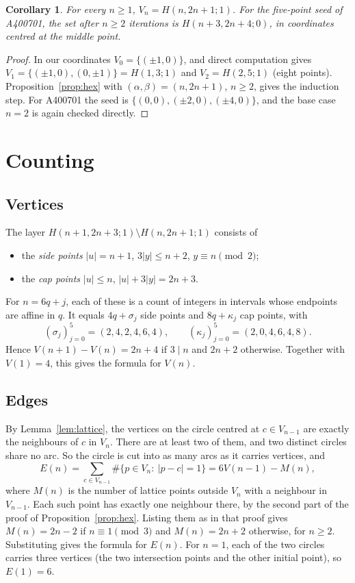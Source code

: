 \documentclass[11pt,a4paper]{amsart}
\newtheorem{corollary}[theorem]{Corollary}
\theoremstyle{definition}
\theoremstyle{remark}
\begin{document}
\begin{corollary}\label{cor:shape}
For every $n\ge1$, $V_n=H(n,2n+1;1)$. For the five-point seed of A400701, the set after $n\ge2$ iterations is $H(n+3,2n+4;0)$, in coordinates centred at the middle point.
\end{corollary}

\begin{proof}
In our coordinates $V_0=\{(\pm1,0)\}$, and direct computation gives $V_1=\{(\pm1,0),(0,\pm1)\}=H(1,3;1)$ and $V_2=H(2,5;1)$ (eight points). Proposition~\ref{prop:hex} with $(\alpha,\beta)=(n,2n+1)$, $n\ge2$, gives the induction step. For A400701 the seed is $\{(0,0),(\pm2,0),(\pm4,0)\}$, and the base case $n=2$ is again checked directly.
\end{proof}

\section{Counting}

\subsection{Vertices} The layer $H(n+1,2n+3;1)\setminus H(n,2n+1;1)$ consists of
\begin{itemize}[leftmargin=2em]
\item the \emph{side points} $|u|=n+1$, $3|y|\le n+2$, $y\equiv n\pmod2$;
\item the \emph{cap points} $|u|\le n$, $|u|+3|y|=2n+3$.
\end{itemize}
For $n=6q+j$, each of these is a count of integers in intervals whose endpoints are affine in $q$. It equals $4q+\sigma_j$ side points and $8q+\kappa_j$ cap points, with
\[
(\sigma_j)_{j=0}^5=(2,4,2,4,6,4),\qquad(\kappa_j)_{j=0}^5=(2,0,4,6,4,8).
\]
Hence $V(n+1)-V(n)=2n+4$ if $3\mid n$ and $2n+2$ otherwise. Together with $V(1)=4$, this gives the formula for $V(n)$.

\subsection{Edges} By Lemma~\ref{lem:lattice}, the vertices on the circle centred at $c\in V_{n-1}$ are exactly the neighbours of $c$ in $V_n$. There are at least two of them, and two distinct circles share no arc. So the circle is cut into as many arcs as it carries vertices, and
\[
E(n)=\sum_{c\in V_{n-1}}\#\{p\in V_n:\ |p-c|=1\}=6V(n-1)-M(n),
\]
where $M(n)$ is the number of lattice points outside $V_n$ with a neighbour in $V_{n-1}$. Each such point has exactly one neighbour there, by the second part of the proof of Proposition~\ref{prop:hex}. Listing them as in that proof gives $M(n)=2n-2$ if $n\equiv1\pmod3$ and $M(n)=2n+2$ otherwise, for $n\ge2$. Substituting gives the formula for $E(n)$. For $n=1$, each of the two circles carries three vertices (the two intersection points and the other initial point), so $E(1)=6$.
\end{document}
